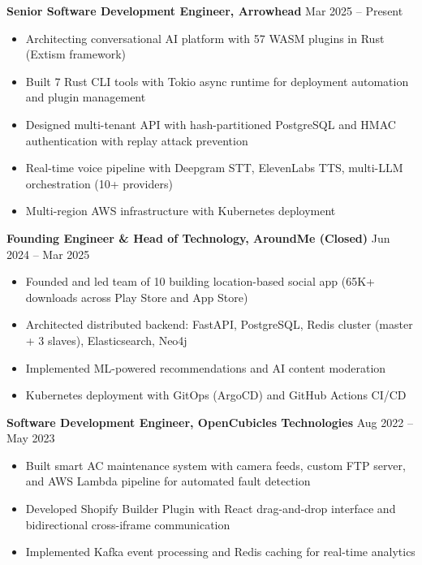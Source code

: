 \documentclass[11pt,a4paper]{article}
\begin{document}
\noindent\textbf{Senior Software Development Engineer, Arrowhead} \hfill Mar 2025 -- Present
\begin{itemize}[leftmargin=*, topsep=8pt, itemsep=8pt, parsep=0pt]
    \item Architecting conversational AI platform with 57 WASM plugins in Rust (Extism framework)
    \item Built 7 Rust CLI tools with Tokio async runtime for deployment automation and plugin management
    \item Designed multi-tenant API with hash-partitioned PostgreSQL and HMAC authentication with replay attack prevention
    \item Real-time voice pipeline with Deepgram STT, ElevenLabs TTS, multi-LLM orchestration (10+ providers)
    \item Multi-region AWS infrastructure with Kubernetes deployment
\end{itemize}

\vspace{14pt}
\noindent\textbf{Founding Engineer \& Head of Technology, AroundMe (Closed)} \hfill Jun 2024 -- Mar 2025
\begin{itemize}[leftmargin=*, topsep=8pt, itemsep=8pt, parsep=0pt]
    \item Founded and led team of 10 building location-based social app (65K+ downloads across Play Store and App Store)
    \item Architected distributed backend: FastAPI, PostgreSQL, Redis cluster (master + 3 slaves), Elasticsearch, Neo4j
    \item Implemented ML-powered recommendations and AI content moderation
    \item Kubernetes deployment with GitOps (ArgoCD) and GitHub Actions CI/CD
\end{itemize}

\vspace{14pt}
\noindent\textbf{Software Development Engineer, OpenCubicles Technologies} \hfill Aug 2022 -- May 2023
\begin{itemize}[leftmargin=*, topsep=8pt, itemsep=8pt, parsep=0pt]
    \item Built smart AC maintenance system with camera feeds, custom FTP server, and AWS Lambda pipeline for automated fault detection
    \item Developed Shopify Builder Plugin with React drag-and-drop interface and bidirectional cross-iframe communication
    \item Implemented Kafka event processing and Redis caching for real-time analytics
\end{itemize}
\end{document}
